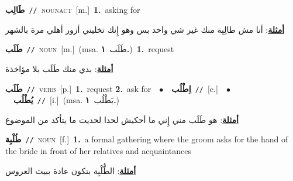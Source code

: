 \documentclass[10pt,a4paper,twoside]{article} %
\begin{document}
\begin{multicols}{2}
{\setlength\topsep{0pt}\textbf{\foreignlanguage{arabic}{طَالِب}}\ {\color{gray}\texttt{//}\color{black}}\ \textsc{noun\textunderscore act}\ [m.]\ \textbf{1.}~asking for\  \begin{flushright}\color{gray}\foreignlanguage{arabic}{\textbf{\underline{\foreignlanguage{arabic}{أمثلة}}}: أنا مش طالِبِة منك غير شي واحد بس وهو إِنك تخليني أزور أهلي مرة بالشهر}\end{flushright}\color{black}} \vspace{2mm}

{\setlength\topsep{0pt}\textbf{\foreignlanguage{arabic}{طَلَب}}\ {\color{gray}\texttt{//}\color{black}}\ \textsc{noun}\ [m.]\ \color{gray}(msa. \foreignlanguage{arabic}{طَلَب}~\foreignlanguage{arabic}{\textbf{١.}})\color{black}\ \textbf{1.}~request\  \begin{flushright}\color{gray}\foreignlanguage{arabic}{\textbf{\underline{\foreignlanguage{arabic}{أمثلة}}}: بدي منك طَلَب بلا مؤاخذة}\end{flushright}\color{black}} \vspace{2mm}

{\setlength\topsep{0pt}\textbf{\foreignlanguage{arabic}{طَلَب}}\ {\color{gray}\texttt{//}\color{black}}\ \textsc{verb}\ [p.]\ \textbf{1.}~request  \textbf{2.}~ask for\ \ $\bullet$\ \ \setlength\topsep{0pt}\textbf{\foreignlanguage{arabic}{اِطْلُب}}\ {\color{gray}\texttt{//}\color{black}}\ [c.]\ \ $\bullet$\ \ \setlength\topsep{0pt}\textbf{\foreignlanguage{arabic}{يُطْلُب}}\ {\color{gray}\texttt{//}\color{black}}\ [i.]\ \color{gray}(msa. \foreignlanguage{arabic}{يَطْلُب}~\foreignlanguage{arabic}{\textbf{١.}})\color{black}\  \begin{flushright}\color{gray}\foreignlanguage{arabic}{\textbf{\underline{\foreignlanguage{arabic}{أمثلة}}}: هو طَلَب مني إِني ما أحكيش لحدا لحديت ما يتأكد من الموضوع}\end{flushright}\color{black}} \vspace{2mm}

{\setlength\topsep{0pt}\textbf{\foreignlanguage{arabic}{طُلْبِة}}\ {\color{gray}\texttt{//}\color{black}}\ \textsc{noun}\ [f.]\ \textbf{1.}~a formal gathering where the groom asks for the hand of the bride in front of her relatives and acquaintances\  \begin{flushright}\color{gray}\foreignlanguage{arabic}{\textbf{\underline{\foreignlanguage{arabic}{أمثلة}}}: الطُّلْبِة بتكون عادة ببيت العروس}\end{flushright}\color{black}} \vspace{2mm}


\end{multicols}
\end{document}
